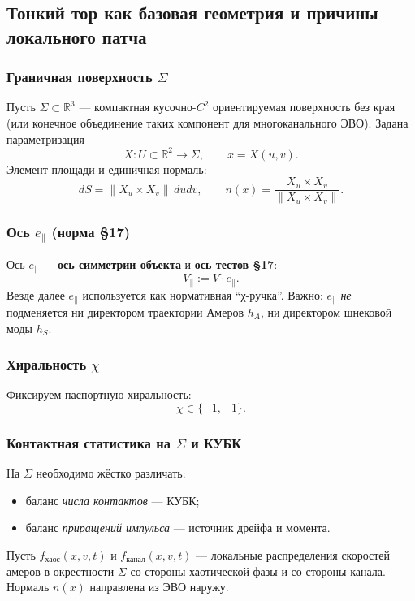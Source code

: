 \subsection{Тонкий тор как базовая геометрия и причины локального патча}

\subsubsection{Граничная поверхность \(\Sigma\)}

Пусть \(\Sigma\subset\mathbb{R}^3\) --- компактная кусочно-\(C^2\) ориентируемая поверхность без края
(или конечное объединение таких компонент для многоканального ЭВО). Задана параметризация
\[
X:U\subset\mathbb{R}^2\to\Sigma,\qquad x=X(u,v).
\]
Элемент площади и единичная нормаль:
\[
dS=\|X_u\times X_v\|\,dudv,\qquad
n(x)=\frac{X_u\times X_v}{\|X_u\times X_v\|}.
\]

\subsubsection{Ось \(e_\parallel\) (норма §17)}

Ось \(e_\parallel\) --- \textbf{ось симметрии объекта} и \textbf{ось тестов §17}:
\[
V_\parallel := V\cdot e_\parallel.
\]
Везде далее \(e_\parallel\) используется как нормативная ``χ-ручка''. Важно: \(e_\parallel\) \emph{не} подменяется ни директором траектории Амеров \(h_A\), ни директором шнековой моды \(h_S\).

\subsubsection{Хиральность \(\chi\)}

Фиксируем паспортную хиральность:
\[
\chi\in\{-1,+1\}.
\]

\subsubsection{Контактная статистика на \(\Sigma\) и КУБК}

На \(\Sigma\) необходимо жёстко различать:
\begin{itemize}
\item баланс \emph{числа контактов} --- КУБК;
\item баланс \emph{приращений импульса} --- источник дрейфа и момента.
\end{itemize}

Пусть \(f_{\mathrm{хаос}}(x,v,t)\) и \(f_{\mathrm{канал}}(x,v,t)\) --- локальные распределения скоростей амеров
в окрестности \(\Sigma\) со стороны хаотической фазы и со стороны канала. Нормаль \(n(x)\) направлена из ЭВО наружу.

